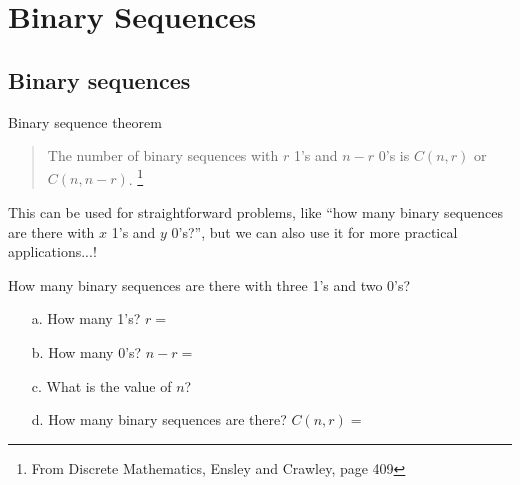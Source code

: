 
\newcommand{\laClass}       {CS 211}
\newcommand{\laSemester}    {Spring 2018}
\newcommand{\laChapter}     {5.4}
\newcommand{\laType}        {Exercise}
\newcommand{\laPoints}      {5}
\newcommand{\laTitle}       {Binary Sequences}
\newcommand{\laDate}        {Jan 25, 2018}
\setcounter{chapter}{5}
\setcounter{section}{4}
\addtocounter{section}{-1}

\toggletrue{answerkey}
\togglefalse{answerkey}






    \section{\laTitle}
    
    \subsection{Binary sequences}

    \begin{intro}{Binary sequence theorem}
        \begin{quote}
			The number of binary sequences with $r$ 1's and $n-r$ 0's is $C(n,r)$ or $C(n, n-r)$.
			\footnote{From Discrete Mathematics, Ensley and Crawley, page 409}
        \end{quote}
        
        This can be used for straightforward problems, like ``how many binary sequences are there
        with $x$ 1's and $y$ 0's?'', but we can also use it for more practical applications...!
    \end{intro}

    \begin{questionNOGRADE}{\thequestion}
        How many binary sequences are there with three 1's and two 0's?
        
        \begin{enumerate}
	        \item[a.]	How many 1's? $r = $
	        \item[b.]	How many 0's? $n-r = $
	        \item[c.]	What is the value of $n$?
	        \item[d.]	How many binary sequences are there? $C(n,r) = $
		\end{enumerate}
    \end{questionNOGRADE}
    
